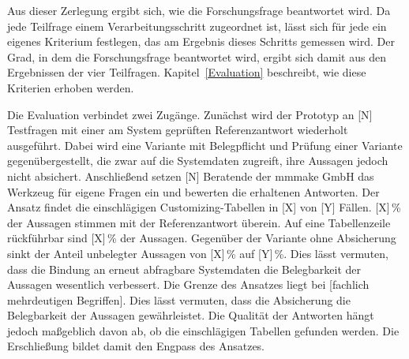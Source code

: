 Aus dieser Zerlegung ergibt sich, wie die Forschungsfrage beantwortet wird. Da jede Teilfrage einem Verarbeitungsschritt zugeordnet ist, lässt sich für jede ein eigenes Kriterium festlegen, das am Ergebnis dieses Schritts gemessen wird. Der Grad, in dem die Forschungsfrage beantwortet wird, ergibt sich damit aus den Ergebnissen der vier Teilfragen. Kapitel~\ref{Evaluation} beschreibt, wie diese Kriterien erhoben werden.
 
Die Evaluation verbindet zwei Zugänge. Zunächst wird der Prototyp an [N] Testfragen mit einer am System geprüften Referenzantwort wiederholt ausgeführt. Dabei wird eine Variante mit Belegpflicht und Prüfung einer Variante gegenübergestellt, die zwar auf die Systemdaten zugreift, ihre Aussagen jedoch nicht absichert. Anschließend setzen [N] Beratende der mmmake GmbH das Werkzeug für eigene Fragen ein und bewerten die erhaltenen Antworten.
Der Ansatz findet die einschlägigen Customizing-Tabellen in [X] von [Y] Fällen. [X]\,\% der Aussagen stimmen mit der Referenzantwort überein. Auf eine Tabellenzeile rückführbar sind [X]\,\% der Aussagen. Gegenüber der Variante ohne Absicherung sinkt der Anteil unbelegter Aussagen von [X]\,\% auf [Y]\,\%.
Dies lässt vermuten, dass die Bindung an erneut abfragbare Systemdaten die Belegbarkeit der Aussagen wesentlich verbessert. Die Grenze des Ansatzes liegt bei [fachlich mehrdeutigen Begriffen].
Dies lässt vermuten, dass die Absicherung die Belegbarkeit der Aussagen gewährleistet. Die Qualität der Antworten hängt jedoch maßgeblich davon ab, ob die einschlägigen Tabellen gefunden werden. Die Erschließung bildet damit den Engpass des Ansatzes.
 
